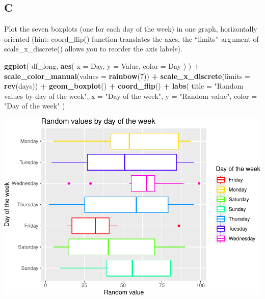 \documentclass[
]{article}
\newenvironment{Shaded}{\begin{snugshade}}{\end{snugshade}}
\newcommand{\DataTypeTok}[1]{\textcolor[rgb]{0.13,0.29,0.53}{#1}}
\newcommand{\DecValTok}[1]{\textcolor[rgb]{0.00,0.00,0.81}{#1}}
\newcommand{\KeywordTok}[1]{\textcolor[rgb]{0.13,0.29,0.53}{\textbf{#1}}}
\newcommand{\NormalTok}[1]{#1}
\newcommand{\OperatorTok}[1]{\textcolor[rgb]{0.81,0.36,0.00}{\textbf{#1}}}
\newcommand{\StringTok}[1]{\textcolor[rgb]{0.31,0.60,0.02}{#1}}
\begin{document}
\hypertarget{c-3}{%
\subsection{C}\label{c-3}}

Plot the seven boxplots (one for each day of the week) in one graph,
horizontally oriented (hint: coord\_flip() function translates the axes,
the ``limits'' argument of scale\_x\_discrete() allows you to reorder
the axis labels).

\begin{Shaded}
\begin{Highlighting}[]
\KeywordTok{ggplot}\NormalTok{(}
\NormalTok{  df\_long,}
  \KeywordTok{aes}\NormalTok{(}
    \DataTypeTok{x =}\NormalTok{ Day,}
    \DataTypeTok{y =}\NormalTok{ Value,}
    \DataTypeTok{color =}\NormalTok{ Day}
\NormalTok{  )}
\NormalTok{) }\OperatorTok{+}
\StringTok{  }\KeywordTok{scale\_color\_manual}\NormalTok{(}\DataTypeTok{values =} \KeywordTok{rainbow}\NormalTok{(}\DecValTok{7}\NormalTok{)) }\OperatorTok{+}
\StringTok{  }\KeywordTok{scale\_x\_discrete}\NormalTok{(}\DataTypeTok{limits =} \KeywordTok{rev}\NormalTok{(days)) }\OperatorTok{+}
\StringTok{  }\KeywordTok{geom\_boxplot}\NormalTok{() }\OperatorTok{+}
\StringTok{  }\KeywordTok{coord\_flip}\NormalTok{() }\OperatorTok{+}
\StringTok{  }\KeywordTok{labs}\NormalTok{(}
    \DataTypeTok{title =} \StringTok{"Random values by day of the week"}\NormalTok{,}
    \DataTypeTok{x =} \StringTok{"Day of the week"}\NormalTok{,}
    \DataTypeTok{y =} \StringTok{"Random value"}\NormalTok{,}
    \DataTypeTok{color =} \StringTok{"Day of the week"}
\NormalTok{  )}
\end{Highlighting}
\end{Shaded}

\includegraphics{es_files/figure-latex/unnamed-chunk-16-1.pdf}
\end{document}
